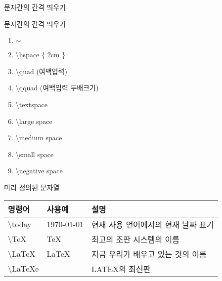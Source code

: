 \documentclass[10pt,xcolor=pdftex,dvipsnames,table,handout]{beamer}
\begin{document}
		\begin{frame}[t,allowframebreaks]{문자간의 간격 띄우기}

			\begin{block} {문자간의 간격 띄우기}
			\begin{enumerate}

			\item $\sim$\\
			\item \textbackslash hspace \{ 2cm \} \\
			\item \textbackslash quad 	(여백입력)\\
			\item \textbackslash qquad 	(여백입력 두배크기)\\
			\item \textbackslash textspace \\
			\item \textbackslash large space \\
			\item \textbackslash medium space \\
			\item \textbackslash small space \\
			\item \textbackslash negative space \\
			\end{enumerate}

			\end{block}
		\end{frame}


		\begin{frame}[t,allowframebreaks]{미리 정의된 문자열}

			\begin{center}
			\begin{table}
			\begin{tabular}{ l l l  }
				명령어	&사용예	&설명\\
				\hline
				\textbackslash today 	&\today 		&현재 사용 언어에서의 현재 날짜 표기\\
				\textbackslash TeX 	&\TeX 		&최고의 조판 시스템의 이름\\
				\textbackslash LaTeX 	&\LaTeX 		&지금 우리가 배우고 있는 것의 이름\\
				\textbackslash LaTeXe 	&\LaTeXe		&LATEX의 최신판\\
			\end{tabular}
			\end{table}
			\end{center}

		\end{frame}
\end{document}
